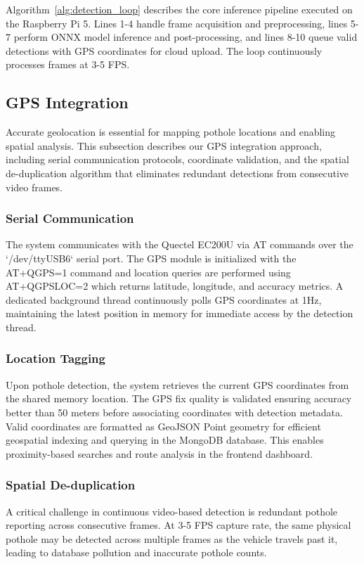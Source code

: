 \documentclass{ieeeaccess}
\begin{document}
Algorithm~\ref{alg:detection_loop} describes the core inference pipeline executed on the Raspberry Pi 5. Lines 1-4 handle frame acquisition and preprocessing, lines 5-7 perform ONNX model inference and post-processing, and lines 8-10 queue valid detections with GPS coordinates for cloud upload. The loop continuously processes frames at 3-5 FPS.

\subsection{GPS Integration}

Accurate geolocation is essential for mapping pothole locations and enabling spatial analysis. This subsection describes our GPS integration approach, including serial communication protocols, coordinate validation, and the spatial de-duplication algorithm that eliminates redundant detections from consecutive video frames.

\subsubsection{Serial Communication}
The system communicates with the Quectel EC200U via AT commands over the `/dev/ttyUSB6` serial port. The GPS module is initialized with the AT+QGPS=1 command and location queries are performed using AT+QGPSLOC=2 which returns latitude, longitude, and accuracy metrics. A dedicated background thread continuously polls GPS coordinates at 1Hz, maintaining the latest position in memory for immediate access by the detection thread.

\subsubsection{Location Tagging}
Upon pothole detection, the system retrieves the current GPS coordinates from the shared memory location. The GPS fix quality is validated ensuring accuracy better than 50 meters before associating coordinates with detection metadata. Valid coordinates are formatted as GeoJSON Point geometry for efficient geospatial indexing and querying in the MongoDB database. This enables proximity-based searches and route analysis in the frontend dashboard.

\subsubsection{Spatial De-duplication}
A critical challenge in continuous video-based detection is redundant pothole reporting across consecutive frames. At 3-5 FPS capture rate, the same physical pothole may be detected across multiple frames as the vehicle travels past it, leading to database pollution and inaccurate pothole counts.
\end{document}
